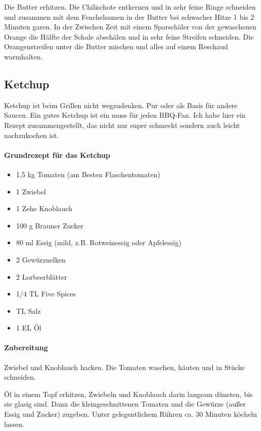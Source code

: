 Die Butter erhitzen. Die Chilischote entkernen und in sehr feine Ringe schneiden 
und zusammen 
mit dem Fenchelsamen in der Butter bei 
schwacher Hitze 1 bis 2 Minuten garen. In der Zwischen Zeit mit einem Sparschäler von der 
gewaschenen Orange die Hälfte der Schale 
abschälen und in sehr feine Streifen schneiden. Die Orangenstreifen unter die Butter mischen 
und alles auf einem Reschaud warmhalten.

\subsection{Ketchup}
Ketchup ist beim Grillen nicht wegzudenken. Pur oder als Basis für andere 
Saucen. Ein gutes Ketchup ist ein muss für jeden BBQ-Fan.
Ich habe hier ein Rezept zusammengestellt, das nicht nur super schmeckt 
sondern auch leicht nachzukochen ist. 
\newline

\paragraph{Grundrezept für das Ketchup}\label{Ketchup}

\begin{itemize}[noitemsep]
	\item 1,5 kg Tomaten (am Besten Flaschentomaten)
	\item 1 Zwiebel
	\item 1 Zehe Knoblauch
	\item 100 g Brauner Zucker
	\item 80 ml Essig (mild, z.B. Rotweinessig oder Apfelessig)
	\item 2 Gewürznelken
	\item 2 Lorbeerblätter
	\item 1/4 TL Five Spices
	\item TL Salz
	\item 1 EL Öl
\end{itemize}

\paragraph{Zubereitung}

Zwiebel und Knoblauch hacken. Die Tomaten waschen, häuten und in Stücke 
schneiden.

Öl in einem Topf erhitzen, Zwiebeln und Knoblauch darin langsam dünsten, bis 
sie glasig sind.
Dann die kleingeschnittenen Tomaten und die Gewürze (außer Essig und 
Zucker) zugeben. Unter gelegentlichem
Rühren ca. 30 Minuten köcheln lassen.

